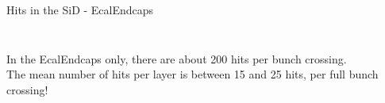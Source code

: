 \documentclass[xcolor={dvipsnames}]{beamer}
\begin{document}
\begin{frame}{Hits in the SiD - EcalEndcaps}
\begin{columns}
\begin{column}[T]{0.5\textwidth}
{\begin{figure}
\end{figure}
}
\end{column}
\end{columns}
In the EcalEndcaps only, there are about 200 hits per bunch crossing.\\
The mean number of hits per layer is between 15 and 25 hits, per full bunch crossing!
\end{frame}
\end{document}

